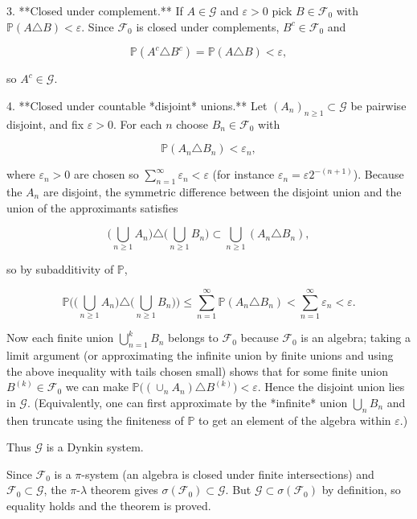\documentclass{article}
\newcommand{\1}{\mathds{1}}
\begin{document}
3. **Closed under complement.**
   If $A\in\mathcal G$ and $\varepsilon>0$ pick $B\in\mathcal F_0$ with $\mathbb P(A\triangle B)<\varepsilon$. Since $\mathcal F_0$ is closed under complements, $B^c\in\mathcal F_0$ and

   $$
   \mathbb P(A^c\triangle B^c)=\mathbb P(A\triangle B)<\varepsilon,
   $$

   so $A^c\in\mathcal G$.

4. **Closed under countable *disjoint* unions.**
   Let $(A_n)_{n\ge1}\subset\mathcal G$ be pairwise disjoint, and fix $\varepsilon>0$. For each $n$ choose $B_n\in\mathcal F_0$ with

   $$
   \mathbb P(A_n\triangle B_n)<\varepsilon_n,
   $$

   where $\varepsilon_n>0$ are chosen so $\sum_{n=1}^\infty\varepsilon_n<\varepsilon$ (for instance $\varepsilon_n=\varepsilon2^{-(n+1)}$). Because the $A_n$ are disjoint, the symmetric difference between the disjoint union and the union of the approximants satisfies

   $$
   \Big(\bigcup_{n\ge1}A_n\Big)\triangle\Big(\bigcup_{n\ge1}B_n\Big)
   \subset \bigcup_{n\ge1}(A_n\triangle B_n),
   $$

   so by subadditivity of $\mathbb P$,

   $$
   \mathbb P\Big(\Big(\bigcup_{n\ge1}A_n\Big)\triangle\Big(\bigcup_{n\ge1}B_n\Big)\Big)
   \le \sum_{n=1}^\infty \mathbb P(A_n\triangle B_n)
   <\sum_{n=1}^\infty\varepsilon_n<\varepsilon.
   $$

   Now each finite union $\bigcup_{n=1}^k B_n$ belongs to $\mathcal F_0$ because $\mathcal F_0$ is an algebra; taking a limit argument (or approximating the infinite union by finite unions and using the above inequality with tails chosen small) shows that for some finite union $B^{(k)}\in\mathcal F_0$ we can make $\mathbb P\big((\cup_n A_n)\triangle B^{(k)}\big)<\varepsilon$. Hence the disjoint union lies in $\mathcal G$. (Equivalently, one can first approximate by the *infinite* union $\bigcup_n B_n$ and then truncate using the finiteness of $\mathbb P$ to get an element of the algebra within $\varepsilon$.)

Thus $\mathcal G$ is a Dynkin system.

Since $\mathcal F_0$ is a $\pi$-system (an algebra is closed under finite intersections) and $\mathcal F_0\subset\mathcal G$, the $\pi$-$\lambda$ theorem gives $\sigma(\mathcal F_0)\subset\mathcal G$. But $\mathcal G\subset\sigma(\mathcal F_0)$ by definition, so equality holds and the theorem is proved.
\end{document}
